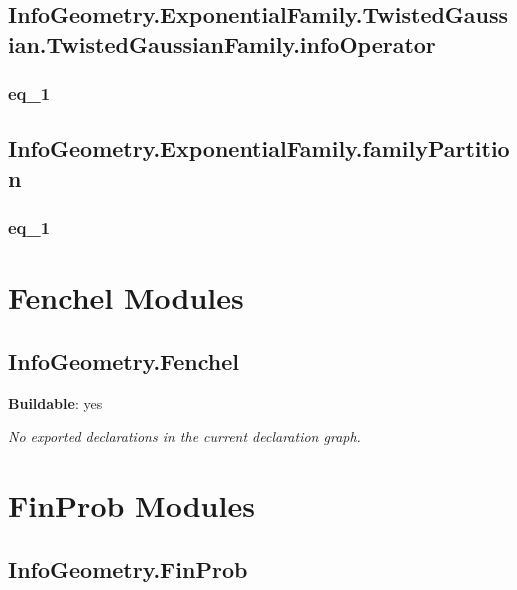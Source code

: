 \section{InfoGeometry.ExponentialFamily.TwistedGaussian.TwistedGaussianFamily.infoOperator}

\subsection*{eq_1}

\begin{theorem}[blueprint="infogeometry:exponentialfamily:twistedgaussian:twistedgaussianfamily:infooperator:eq_1"]
\end{theorem}

\section{InfoGeometry.ExponentialFamily.familyPartition}

\subsection*{eq_1}

\begin{theorem}[blueprint="infogeometry:exponentialfamily:familypartition:eq_1"]
\end{theorem}

\chapter{Fenchel Modules}

\section{InfoGeometry.Fenchel}

\noindent\textbf{Buildable}: yes

\noindent\emph{No exported declarations in the current declaration graph.}

\chapter{FinProb Modules}

\section{InfoGeometry.FinProb}

